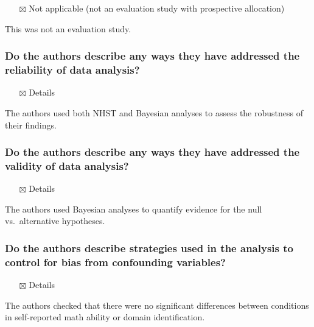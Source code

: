 \documentclass[
  doc, a4paper]{apa7}
\providecommand{\tightlist}{%
  \setlength{\itemsep}{0pt}\setlength{\parskip}{0pt}}
\begin{document}
\begin{itemize}
\tightlist
\item[$\boxtimes$]
  Not applicable (not an evaluation study with prospective allocation)
\end{itemize}

This was not an evaluation study.

\subsubsection{Do the authors describe any ways they have addressed the reliability of data analysis?}\label{do-the-authors-describe-any-ways-they-have-addressed-the-reliability-of-data-analysis}

\begin{itemize}
\tightlist
\item[$\boxtimes$]
  Details
\end{itemize}

The authors used both NHST and Bayesian analyses to assess the robustness of their findings.

\subsubsection{Do the authors describe any ways they have addressed the validity of data analysis?}\label{do-the-authors-describe-any-ways-they-have-addressed-the-validity-of-data-analysis}

\begin{itemize}
\tightlist
\item[$\boxtimes$]
  Details
\end{itemize}

The authors used Bayesian analyses to quantify evidence for the null vs.~alternative hypotheses.

\subsubsection{Do the authors describe strategies used in the analysis to control for bias from confounding variables?}\label{do-the-authors-describe-strategies-used-in-the-analysis-to-control-for-bias-from-confounding-variables}

\begin{itemize}
\tightlist
\item[$\boxtimes$]
  Details
\end{itemize}

The authors checked that there were no significant differences between conditions in self-reported math ability or domain identification.
\end{document}
